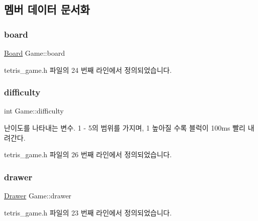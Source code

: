 \subsection{멤버 데이터 문서화}
\mbox{\label{class_game_af5bc546b0c766ecf2f7e008f750832ed}} 
\subsubsection{\texorpdfstring{board}{board}}
{\footnotesize\ttfamily \mbox{\hyperlink{class_board}{Board}} Game\+::board\hspace{0.3cm}{\ttfamily [private]}}



tetris\+\_\+game.\+h 파일의 24 번째 라인에서 정의되었습니다.

\mbox{\label{class_game_a536a6390d16f05d402928bd731e06ef3}} 
\subsubsection{\texorpdfstring{difficulty}{difficulty}}
{\footnotesize\ttfamily int Game\+::difficulty\hspace{0.3cm}{\ttfamily [private]}}



난이도를 나타내는 변수. 1 -\/ 5의 범위를 가지며, 1 높아질 수록 블럭이 100ms 빨리 내려간다. 



tetris\+\_\+game.\+h 파일의 26 번째 라인에서 정의되었습니다.

\mbox{\label{class_game_a045e1468514c0c0d51e968364e0678ad}} 
\subsubsection{\texorpdfstring{drawer}{drawer}}
{\footnotesize\ttfamily \mbox{\hyperlink{class_drawer}{Drawer}} Game\+::drawer\hspace{0.3cm}{\ttfamily [private]}}



tetris\+\_\+game.\+h 파일의 23 번째 라인에서 정의되었습니다.

\mbox{\label{class_game_ae72b7259125e83dfd258c6a132394eec}} 
